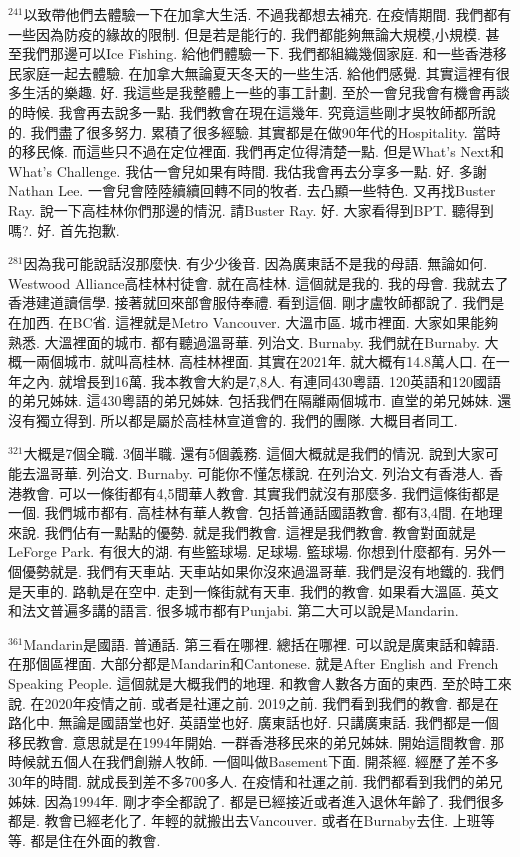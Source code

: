 \documentclass{book}
\begin{document}
$^{241}$以致帶他們去體驗一下在加拿大生活.
不過我都想去補充.
在疫情期間.
我們都有一些因為防疫的緣故的限制.
但是若是能行的.
我們都能夠無論大規模,小規模.
甚至我們那邊可以Ice Fishing.
給他們體驗一下.
我們都組織幾個家庭.
和一些香港移民家庭一起去體驗.
在加拿大無論夏天冬天的一些生活.
給他們感覺.
其實這裡有很多生活的樂趣.
好.
我這些是我整體上一些的事工計劃.
至於一會兒我會有機會再談的時候.
我會再去說多一點.
我們教會在現在這幾年.
究竟這些剛才吳牧師都所說的.
我們盡了很多努力.
累積了很多經驗.
其實都是在做90年代的Hospitality.
當時的移民條.
而這些只不過在定位裡面.
我們再定位得清楚一點.
但是What's Next和What's Challenge.
我估一會兒如果有時間.
我估我會再去分享多一點.
好.
多謝Nathan Lee.
一會兒會陸陸續續回轉不同的牧者.
去凸顯一些特色.
又再找Buster Ray.
說一下高桂林你們那邊的情況.
請Buster Ray.
好.
大家看得到BPT.
聽得到嗎?.
好.
首先抱歉.

$^{281}$因為我可能說話沒那麼快.
有少少後音.
因為廣東話不是我的母語.
無論如何.
Westwood Alliance高桂林村徒會.
就在高桂林.
這個就是我的.
我的母會.
我就去了香港建道讀信學.
接著就回來部會服侍奉禮.
看到這個.
剛才盧牧師都說了.
我們是在加西.
在BC省.
這裡就是Metro Vancouver.
大溫市區.
城市裡面.
大家如果能夠熟悉.
大溫裡面的城市.
都有聽過溫哥華.
列治文.
Burnaby.
我們就在Burnaby.
大概一兩個城市.
就叫高桂林.
高桂林裡面.
其實在2021年.
就大概有14.8萬人口.
在一年之內.
就增長到16萬.
我本教會大約是7,8人.
有連同430粵語.
120英語和120國語的弟兄姊妹.
這430粵語的弟兄姊妹.
包括我們在隔離兩個城市.
直堂的弟兄姊妹.
還沒有獨立得到.
所以都是屬於高桂林宣道會的.
我們的團隊.
大概目者同工.

$^{321}$大概是7個全職.
3個半職.
還有5個義務.
這個大概就是我們的情況.
說到大家可能去溫哥華.
列治文.
Burnaby.
可能你不懂怎樣說.
在列治文.
列治文有香港人.
香港教會.
可以一條街都有4,5間華人教會.
其實我們就沒有那麼多.
我們這條街都是一個.
我們城市都有.
高桂林有華人教會.
包括普通話國語教會.
都有3,4間.
在地理來說.
我們佔有一點點的優勢.
就是我們教會.
這裡是我們教會.
教會對面就是LeForge Park.
有很大的湖.
有些籃球場.
足球場.
籃球場.
你想到什麼都有.
另外一個優勢就是.
我們有天車站.
天車站如果你沒來過溫哥華.
我們是沒有地鐵的.
我們是天車的.
路軌是在空中.
走到一條街就有天車.
我們的教會.
如果看大溫區.
英文和法文普遍多講的語言.
很多城市都有Punjabi.
第二大可以說是Mandarin.

$^{361}$Mandarin是國語.
普通話.
第三看在哪裡.
總括在哪裡.
可以說是廣東話和韓語.
在那個區裡面.
大部分都是Mandarin和Cantonese.
就是After English and French Speaking People.
這個就是大概我們的地理.
和教會人數各方面的東西.
至於時工來說.
在2020年疫情之前.
或者是社運之前.
2019之前.
我們看到我們的教會.
都是在路化中.
無論是國語堂也好.
英語堂也好.
廣東話也好.
只講廣東話.
我們都是一個移民教會.
意思就是在1994年開始.
一群香港移民來的弟兄姊妹.
開始這間教會.
那時候就五個人在我們創辦人牧師.
一個叫做Basement下面.
開茶經.
經歷了差不多30年的時間.
就成長到差不多700多人.
在疫情和社運之前.
我們都看到我們的弟兄姊妹.
因為1994年.
剛才李全都說了.
都是已經接近或者進入退休年齡了.
我們很多都是.
教會已經老化了.
年輕的就搬出去Vancouver.
或者在Burnaby去住.
上班等等.
都是住在外面的教會.
\end{document}
